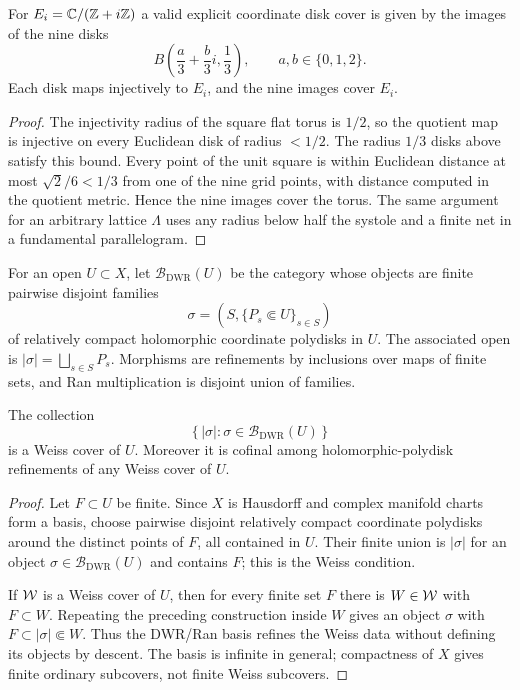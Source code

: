 \begin{lemma}
\label{lem:square-elliptic-disk-correction}
\ClaimStatusProvedHere{}
For $E_i=\mathbb{C}/(\mathbb{Z}+i\mathbb{Z})$ a valid explicit coordinate disk cover is given
by the images of the nine disks
\[
 B\!\left(\frac{a}{3}+\frac{b}{3}i,\frac{1}{3}\right),
 \qquad a,b\in\{0,1,2\}.
\]
Each disk maps injectively to $E_i$, and the nine images cover $E_i$.
\end{lemma}

\begin{proof}
The injectivity radius of the square flat torus is $1/2$, so the
quotient map is injective on every Euclidean disk of radius $<1/2$.
The radius $1/3$ disks above satisfy this bound. Every point of the
unit square is within Euclidean distance at most $\sqrt2/6<1/3$ from
one of the nine grid points, with distance computed in the quotient
metric. Hence the nine images cover the torus. The same argument for an
arbitrary lattice $\Lambda$ uses any radius below half the systole and a
finite net in a fundamental parallelogram.
\end{proof}

\begin{definition}
\label{def:dwr-ran-polydisk-basis-healed}
\ClaimStatusConstruction{}
For an open $U\subset X$, let
$\mathcal B_{\mathrm{DWR}}(U)$ be the category whose objects are finite
pairwise disjoint families
\[
 \sigma=(S,\{P_s\Subset U\}_{s\in S})
\]
of relatively compact holomorphic coordinate polydisks in $U$. The
associated open is $|\sigma|=\bigsqcup_{s\in S}P_s$. Morphisms are
refinements by inclusions over maps of finite sets, and Ran
multiplication is disjoint union of families.
\end{definition}

\begin{proposition}
\label{prop:dwr-ran-weiss-cofinality-healed}
\ClaimStatusProvedHere{}
The collection
\[
 \{\,|\sigma|:\sigma\in \mathcal B_{\mathrm{DWR}}(U)\,\}
\]
is a Weiss cover of $U$. Moreover it is cofinal among
holomorphic-polydisk refinements of any Weiss cover of $U$.
\end{proposition}

\begin{proof}
Let $F\subset U$ be finite. Since $X$ is Hausdorff and complex
manifold charts form a basis, choose pairwise disjoint relatively
compact coordinate polydisks around the distinct points of $F$, all
contained in $U$. Their finite union is $|\sigma|$ for an object
$\sigma\in\mathcal B_{\mathrm{DWR}}(U)$ and contains $F$; this is the
Weiss condition.

If $\mathcal{W}$ is a Weiss cover of $U$, then for every finite set $F$ there
is $W\in\mathcal{W}$ with $F\subset W$. Repeating the preceding construction
inside $W$ gives an object $\sigma$ with $F\subset |\sigma|\Subset W$.
Thus the DWR/Ran basis refines the Weiss data without defining its
objects by descent. The basis is infinite in general; compactness of
$X$ gives finite ordinary subcovers, not finite Weiss subcovers.
\end{proof}

